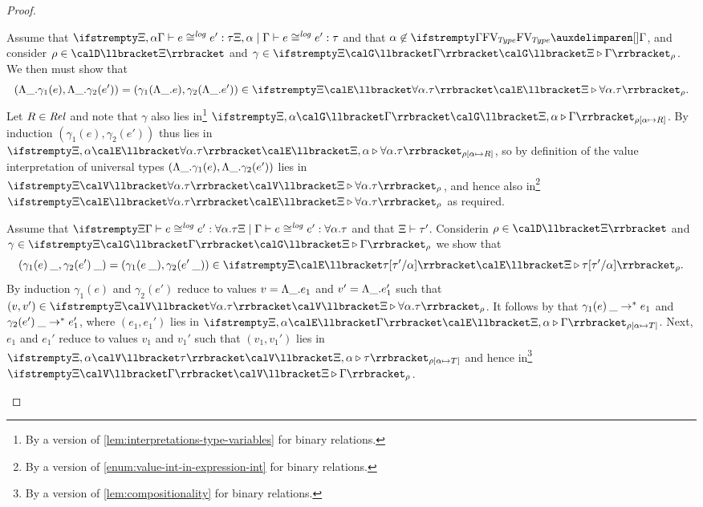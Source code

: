 \begin{proof}
\begin{proofsec}
        \item[\ruleref{RTlam}]
        Assume that $\logequiv{\Xi,\alpha}{\Gamma}{e}{e'}{\tau}$ and that $\alpha \not\in \freeTvar{\Gamma}$, and consider $\rho \in \tvarInt{\Xi}$ and $\gamma \in \conInt{\Xi}{\Gamma}{\rho}$. We then must show that
        \begin{equation*}
            (\expForall{\alpha}{\gamma_1(e)}, \expForall{\alpha}{\gamma_2(e')})
                = (\gamma_1(\expForall{\alpha}{e}), \gamma_2(\expForall{\alpha}{e'}))
                \in \expInt{\Xi}{\typeForall{\alpha}{\tau}}{\rho}.
        \end{equation*}
        Let $R \in \mathit{Rel}$ and note that $\gamma$ also lies in\footnote{By a version of \cref{lem:interpretations-type-variables} for binary relations.} $\conInt{\Xi,\alpha}{\Gamma}{\rho[\alpha \mapsto R]}$. By induction $(\gamma_1(e),\gamma_2(e'))$ thus lies in $\expInt{\Xi,\alpha}{\typeForall{\alpha}{\tau}}{\rho[\alpha \mapsto R]}$, so by definition of the value interpretation of universal types $(\expForall{\alpha}{\gamma_1(e)}, \expForall{\alpha}{\gamma_2(e')})$ lies in $\valInt{\Xi}{\typeForall{\alpha}{\tau}}{\rho}$, and hence also in\footnote{By a version of \cref{enum:value-int-in-expression-int} for binary relations.} $\expInt{\Xi}{\typeForall{\alpha}{\tau}}{\rho}$ as required.

        \item[\ruleref{RTapp}]
        Assume that $\logequiv{\Xi}{\Gamma}{e}{e'}{\typeForall{\alpha}{\tau}}$ and that $\Xi \vdash \tau'$. Considerin $\rho \in \tvarInt{\Xi}$ and $\gamma \in \conInt{\Xi}{\Gamma}{\rho}$ we show that
        \begin{equation*}
            (\expTapp{\gamma_1(e)}{\alpha}, \expTapp{\gamma_2(e')}{\alpha})
                = (\gamma_1(\expTapp{e}{\alpha}), \gamma_2(\expTapp{e'}{\alpha}))
                \in \expInt{\Xi}{\tau[\tau'/\alpha]}{\rho}.
        \end{equation*}
        By induction $\gamma_1(e)$ and $\gamma_2(e')$ reduce to values $v = \expForall{\alpha}{e_1}$ and $v' = \expForall{\alpha}{e_1'}$ such that $(v,v') \in \valInt{\Xi}{\typeForall{\alpha}{\tau}}{\rho}$. It follows by  that $\textcolor{black}{\gamma_1(e)}\:\_ \to^* e_1$ and $\textcolor{black}{\gamma_2(e')}\:\_ \to^* e_1'$, where $(e_1,e_1')$ lies in $\expInt{\Xi,\alpha}{\Gamma}{\rho[\alpha \mapsto T]}$. Next, $e_1$ and $e_1'$ reduce to values $v_1$ and $v_1'$ such that $(v_1,v_1')$ lies in $\valInt{\Xi,\alpha}{\tau}{\rho[\alpha \mapsto T]}$ and hence in\footnote{By a version of \cref{lem:compositionality} for binary relations.} $\valInt{\Xi}{\Gamma}{\rho}$.
    \end{proofsec}
\end{proof}


